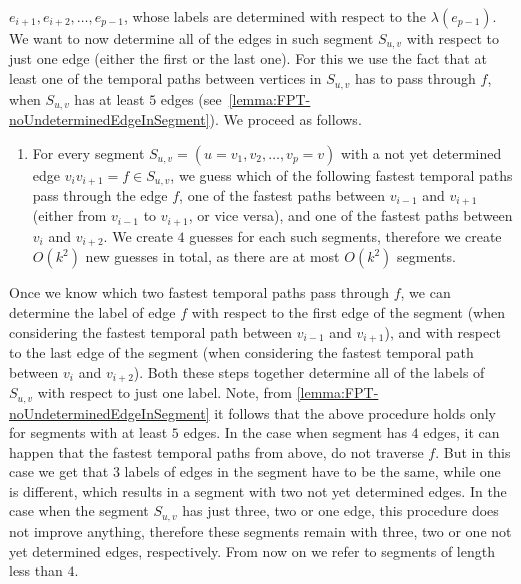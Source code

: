 \documentclass[a4paper,UKenglish,cleveref, autoref, thm-restate, anonymous]{lipics-v2021}
\newcounter{guesscounter}
\begin{document}
$e_{i+1}, e_{i+2}, \dots, e_{p-1}$, whose labels are determined with respect to the $\lambda(e_{p-1})$.
We want to now determine all of the edges in such segment $S_{u,v}$ with respect to just one edge (either the first or the last one).
For this we use the fact that at least one of the temporal paths between vertices in $S_{u,v}$ has to pass through $f$, when $S_{u,v}$ has at least $5$ edges (see~\cref{lemma:FPT-noUndeterminedEdgeInSegment}).
We proceed as follows.
\begin{enumerate}[G-1.]
    \setcounter{enumi}{\value{guesscounter}}
    \item \label{FPT-guessFTPinSegmentTgroughEdge}
    For every segment $S_{u,v} = (u=v_1, v_2, \dots, v_p=v)$  with a not yet determined edge $v_i v_{i+1} = f \in S_{u,v}$,
    we guess which of the following fastest temporal paths pass through the edge $f$,
    one of the fastest paths between $v_{i-1}$ and $v_{i+1}$ (either from $v_{i-1}$ to $v_{i+1}$, or vice versa), 
    and 
    one of the fastest paths between $v_{i}$ and $v_{i+2}$.
    We create $4$ guesses for each such segments, therefore we create $O(k^2)$ new guesses in total, as there are at most $O(k^2)$ segments.
    \setcounter{guesscounter}{\value{enumi}}
\end{enumerate}
Once we know which two fastest temporal paths pass through $f$, 
we can determine the label of edge $f$ 
with respect to the first edge of the segment (when considering the fastest temporal path between $v_{i-1}$ and $v_{i+1}$),
and with respect to the last edge of the segment (when considering the fastest temporal path between $v_{i}$ and $v_{i+2}$).
Both these steps together determine all of the labels of $S_{u,v}$ with respect to just one label.
Note, from \cref{lemma:FPT-noUndeterminedEdgeInSegment} it follows that the above procedure holds only for segments with at least $5$ edges.
In the case when segment has $4$ edges, it can happen that the fastest temporal paths from above, do not traverse $f$. But in this case we get that $3$ labels of edges in the segment have to be the same, while one is different,
which results in a segment with two not yet determined edges.
In the case when the segment $S_{u,v}$ has just three, two or one edge, this procedure does not improve anything,
therefore these segments remain with three, two or one not yet determined edges, respectively.
From now on we refer to segments of length less than $4$.
\end{document}
